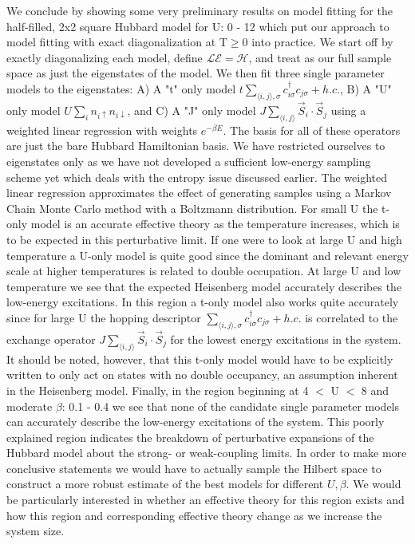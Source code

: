 \documentclass[12pt]{article}
\begin{document}
We conclude by showing some very preliminary results on model fitting for the half-filled, 2x2 square Hubbard model for U: 0 - 12 which put our approach to model fitting with exact diagonalization at T$\geq 0$ into practice.
We start off by exactly diagonalizing each model, define $\mathcal{LE} = \mathcal{H}$, and treat as our full sample space as just the eigenstates of the model.
We then fit three single parameter models to the eigenstates: A) 
A "t" only model $t \sum_{\langle i, j \rangle, \sigma} c_{i\sigma}^\dagger c_{j\sigma} + h.c.$, B) A "U" only model $U \sum_{i} n_{i\uparrow} n_{i\downarrow}$, and C) A "J" only model $J \sum_{\langle i,j \rangle} \vec{S}_i \cdot \vec{S}_j$ using a weighted linear regression with weights $e^{-\beta E}$.
The basis for all of these operators are just the bare Hubbard Hamiltonian basis.
We have restricted ourselves to eigenstates only as we have not developed a sufficient low-energy sampling scheme yet which deals with the entropy issue discussed earlier.
The weighted linear regression approximates the effect of generating samples using a Markov Chain Monte Carlo method with a Boltzmann distribution.
For small U the t-only model is an accurate effective theory as the temperature increases, which is to be expected in this perturbative limit.
If one were to look at large U and high temperature a U-only model is quite good since the dominant and relevant energy scale at higher temperatures is related to double occupation.
At large U and low temperature we see that the expected Heisenberg model accurately describes the low-energy excitations. 
In this region a t-only model also works quite accurately since for large U the hopping descriptor $\sum_{\langle i, j \rangle, \sigma} c_{i\sigma}^\dagger c_{j\sigma} + h.c.$ is correlated to the exchange operator $J \sum_{\langle i,j \rangle} \vec{S}_i \cdot \vec{S}_j$ for the lowest energy excitations in the system.
It should be noted, however, that this t-only model would have to be explicitly written to only act on states with no double occupancy, an assumption inherent in the Heisenberg model. 
Finally, in the region beginning at 4 $<$ U $<$ 8 and moderate $\beta$: 0.1 - 0.4 we see that none of the candidate single parameter models can accurately describe the low-energy excitations of the system.
This poorly explained region indicates the breakdown of perturbative expansions of the Hubbard model about the strong- or weak-coupling limits.
In order to make more conclusive statements we would have to actually sample the Hilbert space to construct a more robust estimate of the best models for different $U, \beta$.
We would be particularly interested in whether an effective theory for this region exists and how this region and corresponding effective theory change as we increase the system size.
\end{document}
